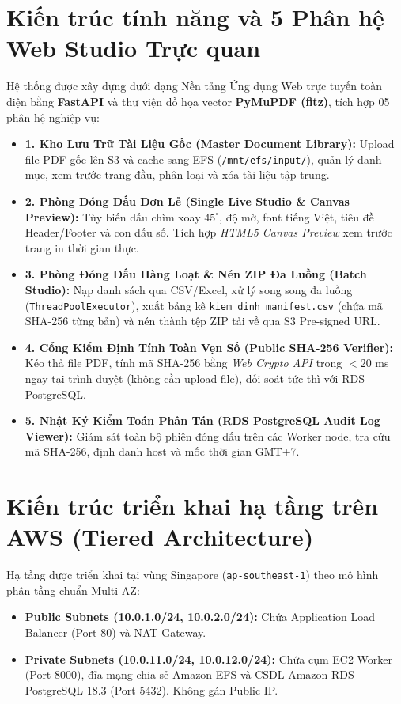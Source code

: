\documentclass[12pt,a4paper]{report}
\begin{document}
\section{Kiến trúc tính năng và 5 Phân hệ Web Studio Trực quan}
Hệ thống được xây dựng dưới dạng Nền tảng Ứng dụng Web trực tuyến toàn diện bằng \textbf{FastAPI} và thư viện đồ họa vector \textbf{PyMuPDF (fitz)}, tích hợp 05 phân hệ nghiệp vụ:
\begin{itemize}
    \item \textbf{1. Kho Lưu Trữ Tài Liệu Gốc (Master Document Library):} Upload file PDF gốc lên S3 và cache sang EFS (\texttt{/mnt/efs/input/}), quản lý danh mục, xem trước trang đầu, phân loại và xóa tài liệu tập trung.
    \item \textbf{2. Phòng Đóng Dấu Đơn Lẻ (Single Live Studio \& Canvas Preview):} Tùy biến dấu chìm xoay $45^\circ$, độ mờ, font tiếng Việt, tiêu đề Header/Footer và con dấu số. Tích hợp \textit{HTML5 Canvas Preview} xem trước trang in thời gian thực.
    \item \textbf{3. Phòng Đóng Dấu Hàng Loạt \& Nén ZIP Đa Luồng (Batch Studio):} Nạp danh sách qua CSV/Excel, xử lý song song đa luồng (\texttt{ThreadPoolExecutor}), xuất bảng kê \texttt{kiem\_dinh\_manifest.csv} (chứa mã SHA-256 từng bản) và nén thành tệp ZIP tải về qua S3 Pre-signed URL.
    \item \textbf{4. Cổng Kiểm Định Tính Toàn Vẹn Số (Public SHA-256 Verifier):} Kéo thả file PDF, tính mã SHA-256 bằng \textit{Web Crypto API} trong $<20$ ms ngay tại trình duyệt (không cần upload file), đối soát tức thì với RDS PostgreSQL.
    \item \textbf{5. Nhật Ký Kiểm Toán Phân Tán (RDS PostgreSQL Audit Log Viewer):} Giám sát toàn bộ phiên đóng dấu trên các Worker node, tra cứu mã SHA-256, định danh host và mốc thời gian GMT+7.
\end{itemize}

\section{Kiến trúc triển khai hạ tầng trên AWS (Tiered Architecture)}
Hạ tầng được triển khai tại vùng Singapore (\texttt{ap-southeast-1}) theo mô hình phân tầng chuẩn Multi-AZ:
\begin{itemize}
    \item \textbf{Public Subnets (10.0.1.0/24, 10.0.2.0/24):} Chứa Application Load Balancer (Port 80) và NAT Gateway.
    \item \textbf{Private Subnets (10.0.11.0/24, 10.0.12.0/24):} Chứa cụm EC2 Worker (Port 8000), đĩa mạng chia sẻ Amazon EFS và CSDL Amazon RDS PostgreSQL 18.3 (Port 5432). Không gán Public IP.
\end{itemize}
\end{document}
